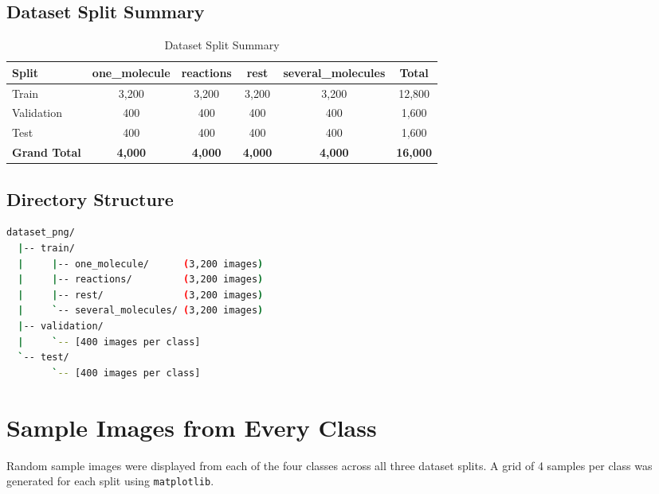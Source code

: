 \documentclass[12pt,a4paper]{article}
\newcommand{\code}[1]{\texttt{\small #1}}
\begin{document}
\subsection{Dataset Split Summary}

\begin{table}[H]
\centering
\caption{Dataset Split Summary}
\label{tab:dataset_split}
\begin{tabular}{l c c c c c}
  \toprule
  \textbf{Split} & \textbf{one\_molecule} & \textbf{reactions} & \textbf{rest} & \textbf{several\_molecules} & \textbf{Total} \\
  \midrule
  Train           & 3,200 & 3,200 & 3,200 & 3,200 & 12,800 \\
  Validation      & 400   & 400   & 400   & 400   & 1,600  \\
  Test            & 400   & 400   & 400   & 400   & 1,600  \\
  \midrule
  \textbf{Grand Total} & \textbf{4,000} & \textbf{4,000} & \textbf{4,000} & \textbf{4,000} & \textbf{16,000} \\
  \bottomrule
\end{tabular}
\end{table}

\subsection{Directory Structure}

\begin{lstlisting}[language=sh, numbers=none, caption={Dataset Folder Hierarchy}]
dataset_png/
  |-- train/
  |     |-- one_molecule/      (3,200 images)
  |     |-- reactions/         (3,200 images)
  |     |-- rest/              (3,200 images)
  |     `-- several_molecules/ (3,200 images)
  |-- validation/
  |     `-- [400 images per class]
  `-- test/
        `-- [400 images per class]
\end{lstlisting}

\section{Sample Images from Every Class}

Random sample images were displayed from each of the four classes across all three dataset splits. A grid of 4 samples per class was generated for each split using \code{matplotlib}.
\end{document}
